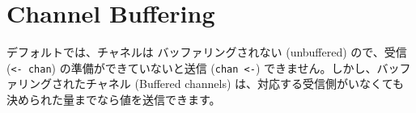 \section{Channel Buffering}

デフォルトでは、チャネルは バッファリングされない (unbuffered) ので、受信 (\texttt{<- chan}) の準備ができていないと送信 (\texttt{chan <-}) できません。しかし、バッファリングされたチャネル (Buffered channels) は、対応する受信側がいなくても決められた量までなら値を送信できます。




